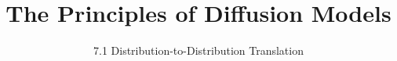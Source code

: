 
\title{The Principles of Diffusion Models}
\subtitle{7.1 Distribution-to-Distribution Translation}


\begin{frame}
    \titlepage
\end{frame}



